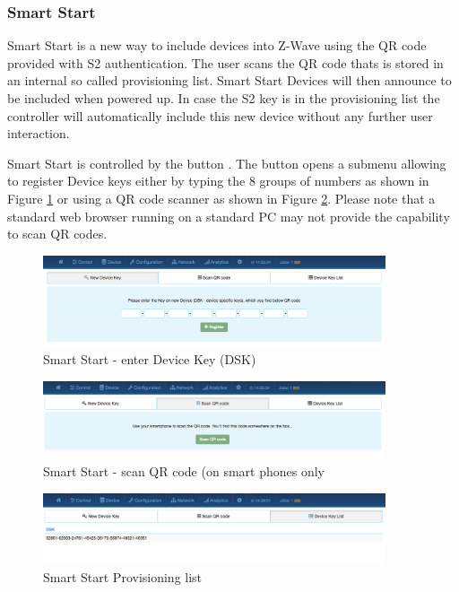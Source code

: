 \subsubsection{Smart Start}

Smart Start is a new way to include devices into Z-Wave using the QR code provided with S2
authentication.  The user scans the QR code thats is stored in an internal so called 
provisioning list. Smart Start Devices will then announce to be included when powered up.
In case the S2 key is in the provisioning list the controller will automatically include 
this new device without any further user interaction.

Smart Start is controlled by the button .
The button  opens a submenu allowing to register Device keys either 
by typing the 8 groups of numbers as shown in Figure \ref{ss1} or using 
a QR code scanner as shown in Figure \ref{ss2}. Please note that a standard
web browser running on a standard PC may not provide the capability to scan QR codes.

\begin{figure}
\begin{center}
\includegraphics[width=0.9\textwidth]{pngs/cap7/ss1.png}
\caption{Smart Start - enter Device Key (DSK)}
\label{ss1}
\end{center}
\end{figure}

\begin{figure}
\begin{center}
\includegraphics[width=0.9\textwidth]{pngs/cap7/ss2.png}
\caption{Smart Start - scan QR code (on smart phones only}
\label{ss2}
\end{center}
\end{figure}

\begin{figure}
\begin{center}
\includegraphics[width=0.9\textwidth]{pngs/cap7/ss3.png}
\caption{Smart Start Provisioning list}
\label{ss3}
\end{center}
\end{figure}

